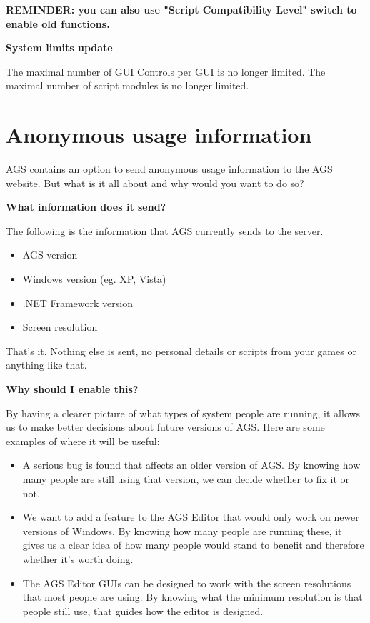 \bf{REMINDER:} you can also use "Script Compatibility Level" switch to enable old functions.

\bf{System limits update}

The maximal number of GUI Controls per GUI is no longer limited.
The maximal number of script modules is no longer limited.




\chapter{Anonymous usage information}\label{AnonymousUsageInfo}%

AGS contains an option to send anonymous usage information to the AGS website.
But what is it all about and why would you want to do so?

\bf{What information does it send?}

The following is the information that AGS currently sends to the server.

\begin{itemize}\itemsep=0pt
\item AGS version
\item Windows version (eg. XP, Vista)
\item .NET Framework version
\item Screen resolution
\end{itemize}

That's it. Nothing else is sent, no personal details or scripts from your games
or anything like that.

\bf{Why should I enable this?}

By having a clearer picture of what types of system people are running, it
allows us to make better decisions about future versions of AGS. Here are some
examples of where it will be useful:

\begin{itemize}
\item A serious bug is found that affects an older version of AGS. By knowing how
many people are still using that version, we can decide whether to fix it or not.
\item We want to add a feature to the AGS Editor that would only work on newer versions of Windows. By
knowing how many people are running these, it gives us a clear idea of how many
people would stand to benefit and therefore whether it's worth doing.
\item The AGS Editor GUIs can be designed to work with the screen resolutions
that most people are using. By knowing what the minimum resolution is that people
still use, that guides how the editor is designed.
\end{itemize}

